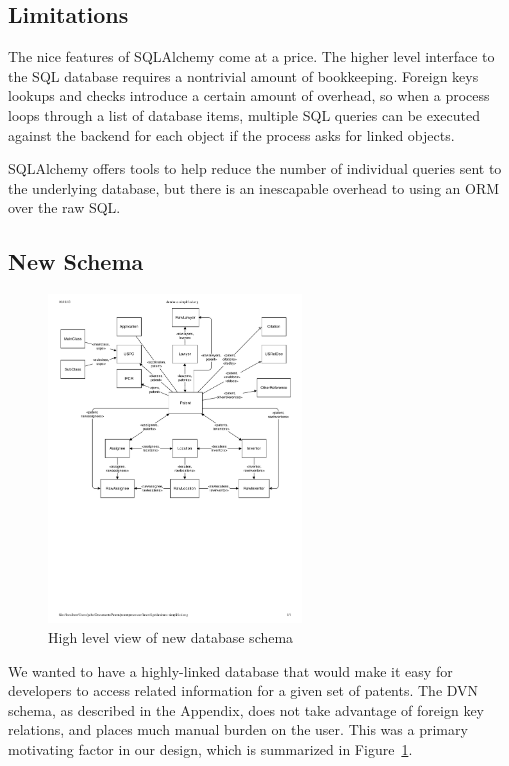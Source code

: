 \subsection{Limitations}

The nice features of SQLAlchemy come at a price. The higher level
interface to the SQL database requires a nontrivial amount of bookkeeping.
Foreign keys lookups and checks introduce a certain amount of overhead,
so when a process loops through a list of database items, multiple
SQL queries can be executed against the backend for each object if
the process asks for linked objects.

SQLAlchemy offers tools to help reduce the number of individual queries
sent to the underlying database, but there is an inescapable overhead
to using an ORM over the raw SQL.


\subsection{New Schema}

\begin{figure}
\center \includegraphics[width=0.6\textwidth]{figs/database-simplified}
\caption{High level view of new database schema}


\label{fig:newschema} 
\end{figure}


We wanted to have a highly-linked database that would make it easy
for developers to access related information for a given set of patents.
The DVN schema, as described in the Appendix, does not take advantage
of foreign key relations, and places much manual burden on the user.
This was a primary motivating factor in our design, which is summarized
in Figure~\ref{fig:newschema}.


